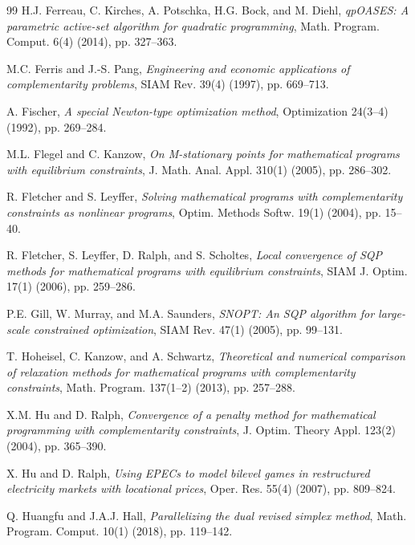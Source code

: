 \begin{thebibliography}{99}
H.J. Ferreau, C. Kirches, A. Potschka, H.G. Bock, and M. Diehl,
\emph{{qpOASES}: A parametric active-set algorithm for quadratic
programming}, Math. Program. Comput. 6(4) (2014), pp. 327--363.


M.C. Ferris and J.-S. Pang, \emph{Engineering and economic applications of complementarity problems},
SIAM Rev. 39(4) (1997), pp. 669--713.


A. Fischer, \emph{A special Newton-type optimization method},
Optimization 24(3--4) (1992), pp. 269--284.


M.L. Flegel and C. Kanzow, \emph{On M-stationary points for
mathematical programs with equilibrium constraints},
J. Math. Anal. Appl. 310(1) (2005), pp. 286--302.


R. Fletcher and S. Leyffer, \emph{Solving mathematical programs with
complementarity constraints as nonlinear programs}, Optim. Methods
Softw. 19(1) (2004), pp. 15--40.


R. Fletcher, S. Leyffer, D. Ralph, and S. Scholtes, \emph{Local
convergence of {SQP} methods for mathematical programs with equilibrium
constraints}, SIAM J. Optim. 17(1) (2006), pp. 259--286.


P.E. Gill, W. Murray, and M.A. Saunders, \emph{SNOPT: An SQP algorithm
for large-scale constrained optimization}, SIAM Rev. 47(1) (2005),
pp. 99--131.


T. Hoheisel, C. Kanzow, and A. Schwartz, \emph{Theoretical and
numerical comparison of relaxation methods for mathematical programs
with complementarity constraints}, Math. Program. 137(1--2) (2013),
pp. 257--288.


X.M. Hu and D. Ralph, \emph{Convergence of a penalty method for
mathematical programming with complementarity constraints},
J. Optim. Theory Appl. 123(2) (2004), pp. 365--390.


X. Hu and D. Ralph, \emph{Using EPECs to model bilevel games in
restructured electricity markets with locational prices},
Oper. Res. 55(4) (2007), pp. 809--824.


Q. Huangfu and J.A.J. Hall, \emph{Parallelizing the dual revised simplex
method}, Math. Program. Comput. 10(1) (2018), pp. 119--142.



\end{thebibliography}
